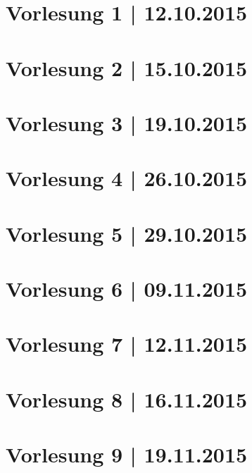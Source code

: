 



\maketitle
\thispagestyle{empty}

\newpage
\tableofcontents %
\clearpage

\newpage
\part*{Vorlesung 1 | 12.10.2015}

\newpage
\part*{Vorlesung 2 | 15.10.2015}


\newpage
\part*{Vorlesung 3 | 19.10.2015}


\newpage
\part*{Vorlesung 4 | 26.10.2015}

\newpage
\part*{Vorlesung 5 | 29.10.2015}

\newpage
\part*{Vorlesung 6 | 09.11.2015}

\newpage
\part*{Vorlesung 7 | 12.11.2015}

\newpage
\part*{Vorlesung 8 | 16.11.2015}

\newpage
\part*{Vorlesung 9 | 19.11.2015}













